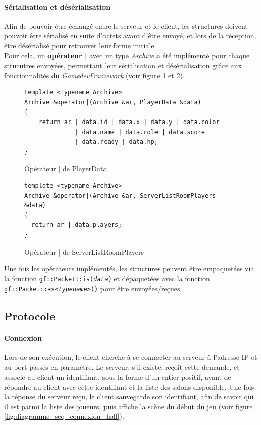 \documentclass[a4paper, 11pt]{article}
\begin{document}
\paragraph{Sérialisation et désérialisation}
Afin de pouvoir être échangé entre le serveur et le client, les structures doivent pouvoir être sérialisé en suite d'octets avant d'être envoyé, et lors de la réception, être désérialisé pour retrouver leur forme initiale.\\
Pour cela, un \textbf{opérateur |} avec un type \textit{Archive} a été implémenté pour chaque strucutres envoyées, permettant leur sérialisation et désérialisation grâce aux fonctionnalités du \textit{GamedevFramework} (voir figure \ref{fig:operateur_ou_player_data} et \ref{fig:operateur_ou_server_list_room_player}).
\vspace{0.5cm}
\begin{figure}[H]
\begin{lstlisting}
template <typename Archive>
Archive &operator|(Archive &ar, PlayerData &data)
{
    return ar | data.id | data.x | data.y | data.color
              | data.name | data.role | data.score
              | data.ready | data.hp;
}
\end{lstlisting}
\caption{Opérateur | de PlayerData}
\label{fig:operateur_ou_player_data}
\end{figure}
\vspace{0.5cm}
\begin{figure}[H]
\begin{lstlisting}
template <typename Archive>
Archive &operator|(Archive &ar, ServerListRoomPlayers &data)
{
  return ar | data.players;
}
\end{lstlisting}
\caption{Opérateur | de ServerListRoomPlayers}
\label{fig:operateur_ou_server_list_room_player}
\end{figure}

Une fois les opérateurs implémentés, les structures peuvent être empaquetées via la fonction \texttt{gf::Packet::is(\textit{data})} et dépaquetées avec la fonction \texttt{gf::Packet::as<\textit{typename}>()} pour être envoyées/reçues.

\subsection{Protocole}
\paragraph{Connexion}
Lors de son exécution, le client cherche à se connecter au serveur à l'adresse IP et au port passés en paramètre. Le serveur, s'il existe, reçoit cette demande, et associe au client un identifiant, sous la forme d'un entier positif, avant de répondre au client avec cette identifiant et la liste des salons disponible.
Une fois la réponse du serveur reçu, le client sauvegarde son identifiant, afin de savoir qui il est parmi la liste des joueurs, puis affiche la scène du début du jeu (voir figure \ref{fig:diagramme_seq_connexion_hall}).
\end{document}
